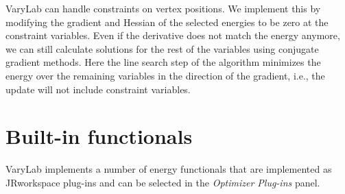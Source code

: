 \documentclass[Thesis.tex]{subfiles}
\begin{document}
{\sc VaryLab} can handle constraints on vertex positions. We implement this by modifying the gradient and Hessian of the selected energies to be zero at the constraint variables. Even if the derivative does not match the energy anymore, we can still calculate solutions for the rest of the variables using conjugate gradient methods. Here the line search step of the algorithm minimizes the energy over the remaining variables in the direction of the gradient, i.e., the update will not include constraint variables.

\section{Built-in functionals}

{\sc VaryLab} implements a number of energy functionals that are implemented as {\sc JRworkspace} plug-ins and can be selected in the \emph{Optimizer Plug-ins} panel.
\end{document}

